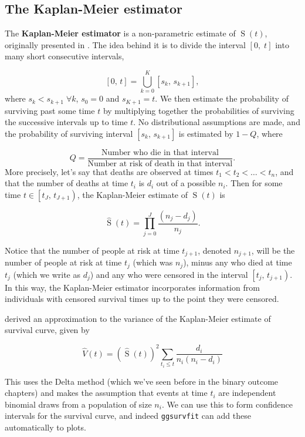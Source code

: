 \documentclass[
  openany]{book}
\theoremstyle{definition}
\theoremstyle{definition}
\theoremstyle{definition}
\theoremstyle{definition}
\theoremstyle{remark}
\begin{document}
\subsection{The Kaplan-Meier estimator}\label{the-kaplan-meier-estimator}

The \textbf{Kaplan-Meier estimator} is a non-parametric estimate of \(\operatorname{S}\left(t\right)\), originally presented in \citet{kaplan1958nonparametric}. The idea behind it is to divide the interval \(\left[0,\;t\right]\) into many short consecutive intervals,

\[\left[0,\,t\right] = \bigcup\limits_{k=0}^K \left[s_k,\,s_{k+1}\right],\]
where \(s_k<s_{k+1}\;\forall{k}\), \(s_0=0\) and \(s_{K+1}=t\). We then estimate the probability of surviving past some time \(t\) by multiplying together the probabilities of surviving the successive intervals up to time \(t\). No distributional assumptions are made, and the probability of surviving interval \(\left[s_k,\,s_{k+1}\right]\) is estimated by \(1-Q\), where

\[Q = \frac{\text{Number who die in that interval}}{\text{Number at risk of death in that interval}}.\]
More precisely, let's say that deaths are observed at times \(t_1<t_2<\ldots < t_n\), and that the number of deaths at time \(t_i\) is \(d_i\) out of a possible \(n_i\). Then for some time \(t\in\left[t_J,\,t_{J+1}\right)\), the Kaplan-Meier estimate of \(\operatorname{S}\left(t\right)\) is

\[\hat{\operatorname{S}}\left(t\right) = \prod\limits_{j=0}^J \frac{\left(n_j - d_j\right)}{n_j}.\]

Notice that the number of people at risk at time \(t_{j+1}\), denoted \(n_{j+1}\), will be the number of people at risk at time \(t_j\) (which was \(n_j\)), minus any who died at time \(t_j\) (which we write as \(d_j\)) and any who were censored in the interval \(\left[t_j,\,t_{j+1}\right)\). In this way, the Kaplan-Meier estimator incorporates information from individuals with censored survival times up to the point they were censored.

\citet{greenwood1926natural} derived an approximation to the variance of the Kaplan-Meier estimate of survival curve, given by

\[\hat{V}\left(t\right) = \left(\hat{\operatorname{S}}\left(t\right)\right)^2\sum\limits_{t_{i}\leq{t}} \frac{d_i}{n_i\left(n_i-d_i\right)} \]

This uses the Delta method (which we've seen before in the binary outcome chapters) and makes the assumption that events at time \(t_i\) are independent binomial draws from a population of size \(n_i\). We can use this to form confidence intervals for the survival curve, and indeed \texttt{ggsurvfit} can add these automatically to plots.
\end{document}
